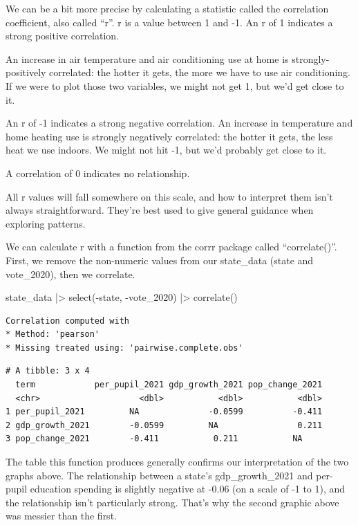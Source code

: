 \documentclass[
  letterpaper,
  DIV=11,
  numbers=noendperiod]{scrreprt}
\newenvironment{Shaded}{\begin{snugshade}}{\end{snugshade}}
\newcommand{\FunctionTok}[1]{\textcolor[rgb]{0.28,0.35,0.67}{#1}}
\newcommand{\NormalTok}[1]{\textcolor[rgb]{0.00,0.23,0.31}{#1}}
\newcommand{\SpecialCharTok}[1]{\textcolor[rgb]{0.37,0.37,0.37}{#1}}
\begin{document}
We can be a bit more precise by calculating a statistic called the
correlation coefficient, also called ``r''. r is a value between 1 and
-1. An r of 1 indicates a strong positive correlation.

An increase in air temperature and air conditioning use at home is
strongly-positively correlated: the hotter it gets, the more we have to
use air conditioning. If we were to plot those two variables, we might
not get 1, but we'd get close to it.

An r of -1 indicates a strong negative correlation. An increase in
temperature and home heating use is strongly negatively correlated: the
hotter it gets, the less heat we use indoors. We might not hit -1, but
we'd probably get close to it.

A correlation of 0 indicates no relationship.

All r values will fall somewhere on this scale, and how to interpret
them isn't always straightforward. They're best used to give general
guidance when exploring patterns.

We can calculate r with a function from the corrr package called
``correlate()''. First, we remove the non-numeric values from our
state\_data (state and vote\_2020), then we correlate.

\begin{Shaded}
\begin{Highlighting}[]
\NormalTok{state\_data }\SpecialCharTok{|\textgreater{}}
  \FunctionTok{select}\NormalTok{(}\SpecialCharTok{{-}}\NormalTok{state, }\SpecialCharTok{{-}}\NormalTok{vote\_2020) }\SpecialCharTok{|\textgreater{}}
  \FunctionTok{correlate}\NormalTok{()}
\end{Highlighting}
\end{Shaded}

\begin{verbatim}
Correlation computed with
* Method: 'pearson'
* Missing treated using: 'pairwise.complete.obs'
\end{verbatim}

\begin{verbatim}
# A tibble: 3 x 4
  term            per_pupil_2021 gdp_growth_2021 pop_change_2021
  <chr>                    <dbl>           <dbl>           <dbl>
1 per_pupil_2021         NA              -0.0599          -0.411
2 gdp_growth_2021        -0.0599         NA                0.211
3 pop_change_2021        -0.411           0.211           NA    
\end{verbatim}

The table this function produces generally confirms our interpretation
of the two graphs above. The relationship between a state's
gdp\_growth\_2021 and per-pupil education spending is slightly negative
at -0.06 (on a scale of -1 to 1), and the relationship isn't
particularly strong. That's why the second graphic above was messier
than the first.
\end{document}
